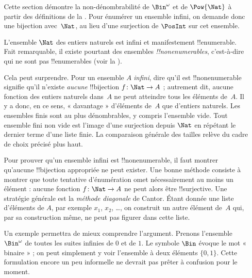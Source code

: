 \documentclass[../../../include/open-logic-section]{subfiles}
\begin{document}


\begin{editorial}
  Cette section démontre la non-dénombrabilité de $\Bin^\omega$
  et de $\Pow{\Nat}$ à partir des définitions de la
  . Pour énumérer un ensemble infini, on
  demande donc une bijection avec~$\Nat$, au lieu d'une
  surjection de $\PosInt$ sur cet ensemble.
\end{editorial}

\begin{explain}
L'ensemble $\Nat$ des entiers naturels est infini et manifestement
!!{enumerable}. Fait remarquable, il existe pourtant des ensembles
\emph{!!{nonenumerable}s}, c'est-à-dire qui ne sont pas
!!{enumerable}s (voir la ).

Cela peut surprendre. Pour un ensemble $A$ \emph{infini}, dire
qu'il est !!{nonenumerable} signifie qu'il n'existe \emph{aucune}
!!{bijection} $f\colon \Nat \to A$ ; autrement dit, aucune
fonction des entiers naturels dans~$A$ ne peut atteindre tous
les éléments de~$A$. Il y a donc, en ce sens, « davantage »
d'éléments de~$A$ que d'entiers naturels. Les ensembles finis sont
au plus dénombrables, y compris l’ensemble vide. Tout ensemble fini
non vide est l’image d’une surjection depuis $\Nat$ en répétant
le dernier terme d’une liste finie. La comparaison générale des
tailles relève du cadre de choix précisé plus haut.
%

Pour prouver qu'un ensemble infini est !!{nonenumerable}, il faut
montrer qu'aucune !!{bijection} appropriée ne peut exister. Une
bonne méthode consiste à montrer que toute tentative d'énumération
omet nécessairement au moins un élément : aucune fonction
$f\colon \Nat \to A$ ne peut alors être !!{surjective}.
Une stratégie générale est la \emph{méthode diagonale} de Cantor.
Étant donnée une liste d'éléments de $A$, par exemple $x_1$, $x_2$,
\dots, on construit un autre élément de~$A$ qui, par sa construction
même, ne peut pas figurer dans cette liste.

Un exemple permettra de mieux comprendre l'argument. Prenons
l'ensemble~$\Bin^\omega$ de toutes les suites infinies de $0$ et
de $1$. Le symbole $\Bin$ évoque le mot « binaire » ; on peut
simplement y voir l'ensemble à deux éléments $\{0,1\}$.
Cette formulation encore un peu informelle ne devrait pas prêter
à confusion pour le moment.
\end{explain}
\end{document}
